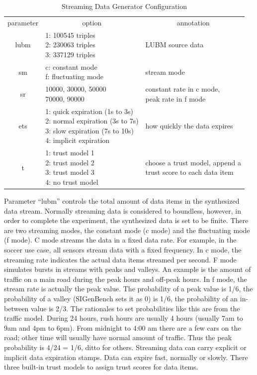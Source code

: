 \begin{table}[!htbp]
	\centering
    \caption{Streaming Data Generator Configuration}
    \label{tab:6-sdgc}
    \begin{tabular}{|c||l|l|} \hline
    parameter & \multicolumn{1}{c|}{option} & \multicolumn{1}{c|}{annotation} \\ \hhline{|=#=|=|}
    lubm & \makecell[l]{1: 100545 triples \\ 2: 230063 triples \\ 3: 337129 triples} & LUBM source data \\ \hline
    sm & \makecell[l]{c: constant mode \\ f: fluctuating mode} & stream mode \\ \hline
    sr & \makecell[l]{10000, 30000, 50000 \\ 70000, 90000} & \makecell[l]{constant rate in c mode, \\ peak rate in f mode} \\ \hline
    ets & \makecell[l]{1: quick expiration (1s to 3s) \\ 2: normal expiration (3s to 7s) \\ 3: slow expiration (7s to 10s) \\ 4: implicit expiration} & how quickly the data expires \\ \hline
    t & \makecell[l]{1: trust model 1 \\ 2: trust model 2 \\ 3: trust model 3 \\ 4: no trust model} & \makecell[l]{choose a trust model, append a \\trust score to each data item} \\ \hline
    \end{tabular}
\end{table}

Parameter ``lubm'' controls the total amount of data items in the synthesized data stream. 
Normally streaming data is considered to boundless, however, in order to complete the experiment, the synthesized data is set to be finite. 
There are two streaming modes, the constant mode (c mode) and the fluctuating mode (f mode).
C mode streams the data in a fixed data rate.
For example, in the soccer use case, all sensors stream data with a fixed frequency.
In c mode, the streaming rate indicates the actual data items streamed per second. 
F mode simulates bursts in streams with peaks and valleys. 
An example is the amount of traffic on a main road during the peak hours and off-peak hours. 
In f mode, the stream rate is actually the peak value. 
The probability of a peak value is 1/6, the probability of a valley (SIGenBench sets it as 0) is 1/6, the probability of an in-between value is 2/3. 
The rationales to set probabilities like this are from the traffic model. 
During 24 hours, rush hours are usually 4 hours (usually 7am to 9am and 4pm to 6pm).
From midnight to 4:00 am there are a few cars on the road; other time will usually have normal amount of traffic. 
Thus the peak probability is 4/24 = 1/6, ditto for others.
Streaming data can carry explicit or implicit data expiration stamps.
Data can expire fast, normally or slowly.
There three built-in trust models to assign trust scores for data items.

